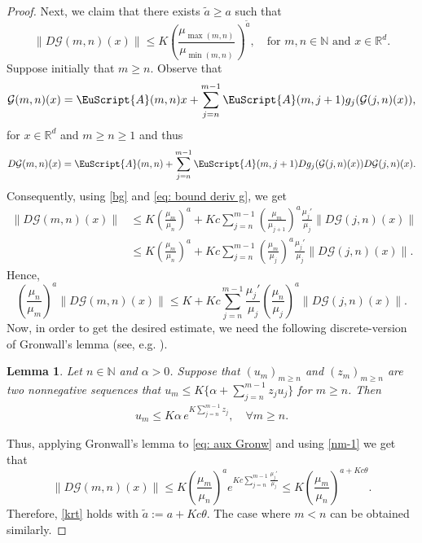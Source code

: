 \documentclass[reqno, a4paper, 10pt]{amsart}
\theoremstyle{plain}
\numberwithin{equation}{section}
\newtheorem{lemma}{Lemma}
\theoremstyle{remark}
\def\N{\mathbb{N}}
\def\cA{\EuScript{A}}
\def\R{\mathbb{R}}
\begin{document}
\begin{proof}
Next, we claim  that there exists $\tilde a \ge a$ such that 
\begin{equation}\label{krt}
\|D\mathcal G(m, n)(x)\| \le  K \left (\frac{\mu_{\max (m,n)}}{\mu_{\min (m,n)}}\right )^{\tilde a}, \quad \text{for $m, n\in \N$ and $x\in \mathbb R^d$}.
\end{equation}
Suppose initially that $m\ge n$. Observe that
\begin{equation*}
\mathcal G(m, n)(x)=\cA(m, n)x+\sum_{j=n}^{m-1} \cA (m, j+1)g_j(\mathcal G(j, n)(x)),
\end{equation*}
for $x\in \R^d$ and $m\ge n \ge 1$ and thus 
\begin{equation}\label{gj}
D\mathcal G(m, n)(x)=\cA(m, n)+\sum_{j=n}^{m-1}\cA(m, j+1)Dg_j(\mathcal G(j, n)(x))D\mathcal G(j, n)(x).
\end{equation}
Consequently, using \eqref{bg} and \eqref{eq: bound deriv g}, we get
\[
\begin{split}
\|D\mathcal G(m, n)(x)\| &\le K\left (\frac{\mu_m}{\mu_n}\right )^a+Kc\sum_{j=n}^{m-1}\left (\frac{\mu_m}{\mu_{j+1}}\right )^a \frac{\mu_j'}{\mu_j}\|D\mathcal G(j, n)(x)\| \\
&\le K\left (\frac{\mu_m}{\mu_n}\right )^a+Kc\sum_{j=n}^{m-1}\left (\frac{\mu_m}{\mu_{j}}\right )^a \frac{\mu_j'}{\mu_j}\|D\mathcal G(j, n)(x)\|.
\end{split}
\]
Hence, 
\begin{equation}\label{eq: aux Gronw}
\left (\frac{\mu_n}{\mu_m}\right )^a \|D\mathcal G(m, n)(x)\| \le K+Kc \sum_{j=n}^{m-1}\frac{\mu_j'}{\mu_j}\left (\frac{\mu_n}{\mu_j}\right )^a \|D\mathcal G(j, n)(x)\|.
\end{equation}
Now, in order to get the desired estimate, we need the following discrete-version of Gronwall's lemma (see, e.g. \cite[Lemma 4.32]{E-book}).
\begin{lemma}\label{lm-G}
Let $n\in \N$ and $\alpha >0$. Suppose that $(u_m)_{m\ge n}$ and $(z_m)_{m\ge n}$ are two nonnegative sequences that 
$
u_m \le K\{\alpha + \sum_{j=n}^{m-1} z_ju_j\}
$
for $m \ge n$.
Then
\begin{align*}
u_m \le K\alpha \,e^{K\sum_{j=n}^{m-1} z_j}, \quad \forall m \ge n.
\end{align*}
\end{lemma}
Thus, applying Gronwall's lemma to \eqref{eq: aux Gronw} and using \eqref{nm-1} we get that   
\[
\|D\mathcal G(m, n)(x)\| \le K\left (\frac{\mu_m}{\mu_n}\right )^a e^{Kc\sum_{j=n}^{m-1}\frac{\mu_j'}{\mu_j}} \le K\left (\frac{\mu_m}{\mu_n}\right )^{a+Kc\theta}.
\]
Therefore, \eqref{krt} holds with $\tilde a:=a+Kc\theta$. The case where $m<n$ can be obtained similarly.





\end{proof}
\end{document}

